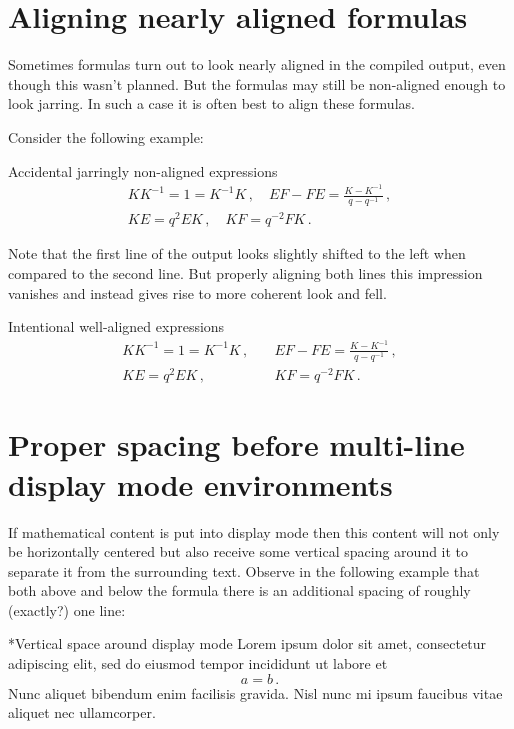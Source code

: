




\section{Aligning nearly aligned formulas}

Sometimes formulas turn out to look nearly aligned in the compiled output, even though this wasn’t planned.
But the formulas may still be non-aligned enough to look jarring.
In such a case it is often best to align these formulas.

Consider the following example:
\begin{showlatex}{Accidental jarringly non-aligned expressions}
\begin{gather*}
  KK^{-1} = 1 = K^{-1}K \,,
  \quad
  EF - FE = \frac{ K - K^{-1} }{ q - q^{-1} } \,,
  \\
  KE = q^2 EK \,,
  \quad
  KF = q^{-2} FK \,.
\end{gather*}
\end{showlatex}
Note that the first line of the output looks slightly shifted to the left when compared to the second line.
But properly aligning both lines this impression vanishes and instead gives rise to more coherent look and fell.
\begin{showlatex}{Intentional well-aligned expressions}
\begin{align*}
  KK^{-1} = 1 = K^{-1}K \,,
  \quad
  &EF - FE = \frac{ K - K^{-1} }{ q - q^{-1} } \,,
  \\
  KE = q^2 EK \,,
  \quad
  &KF = q^{-2} FK \,.
\end{align*}
\end{showlatex}






\section{Proper spacing before multi-line display mode environments}
\label{spacing before multi-line}

If mathematical content is put into display mode then this content will not only be horizontally centered but also receive some vertical spacing around it to separate it from the surrounding text.
Observe in the following example that both above and below the formula there is an additional spacing of roughly (exactly?) one line:
\begin{showlatex}*{Vertical space around display mode}
Lorem ipsum dolor sit amet, consectetur adipiscing elit, sed do eiusmod tempor incididunt ut labore et
\[
  a = b \,.
\]
Nunc aliquet bibendum enim facilisis gravida. Nisl nunc mi ipsum faucibus vitae aliquet nec ullamcorper.
\end{showlatex}

